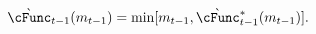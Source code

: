   \begin{equation}\begin{gathered}\begin{aligned}
        \grave{\cFunc}_{\prd-1}({m}_{\prd-1})  & = \min[{m}_{\prd-1},\grave{\cFunc}^{\ast}_{\prd-1}({m}_{\prd-1})] \label{eq:LiqCons}.
      \end{aligned}\end{gathered}\end{equation}

